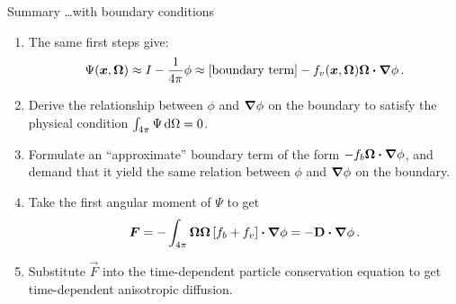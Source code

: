 \documentclass{beamer}
\begin{document}
\begin{frame}{Summary \dots{}with boundary conditions}
\begin{enumerate}
  \item The same first steps give:
    \begin{equation*}
      \Psi(\bm{x}, \bm{\Omega}) \approx I - \frac{1}{4\pi}\phi
      \approx [\text{boundary term}]
      - f_v(\bm{x}, \bm{\Omega})  \bm{\Omega} \bm{\cdot} \bm{\nabla} \phi\,.
    \end{equation*}
  \item Derive the relationship between $\phi$ and $\bm{\nabla}\phi$ on the boundary
    to satisfy the physical condition $\int_{4\pi} \Psi \mathop{}\!\mathrm{d} \Omega=0$.
  \item Formulate an ``approximate'' boundary term of the form $-f_b
    \bm{\Omega} \bm{\cdot} \bm{\nabla} \phi$, and demand that it yield the same relation
    between $\phi$ and $\bm{\nabla}\phi$ on the boundary.
  \item Take the first angular moment of $\Psi$ to get
    \begin{equation*}
      \bm{F} = - \int_{4\pi}\bm{\Omega}\bm{\Omega}
      \left[ f_b+ f_v \right]\bm{\cdot} \bm{\nabla} \phi
      = -\mathbf{D} \bm{\cdot} \bm{\nabla} \phi \,.
    \end{equation*}
  \item Substitute $\vec{F}$ into the time-dependent particle conservation
    equation to get time-dependent anisotropic diffusion.
\end{enumerate}
\end{frame}
\end{document}
